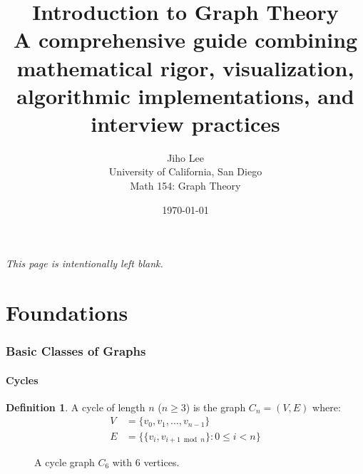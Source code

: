 \documentclass{article}
\title{\Huge\bfseries Introduction to Graph Theory \\[1em]
\Large A comprehensive guide combining mathematical rigor, visualization, algorithmic implementations, and interview practices}
\author{\Large Jiho Lee \\ University of California, San Diego \\[1em] \Large Math 154: Graph Theory}
\date{\Large\today}
\theoremstyle{definition}
\newtheorem{definition}{Definition}
\begin{document}
\begin{titlepage}
    \maketitle
    \thispagestyle{empty}
\end{titlepage}

\newpage
\tableofcontents

\newpage
\thispagestyle{empty}
\vspace*{\fill}
\begin{center}
    \textit{This page is intentionally left blank.}
\end{center}
\vspace*{\fill}
\newpage
\part{Foundations}


\section{Basic Classes of Graphs}\label{sec:basic-classes}

\subsection{Cycles}
\begin{definition}
A cycle of length $n$ ($n \geq 3$) is the graph $C_n = (V, E)$ where:
\begin{align*}
V &= \{v_0, v_1, \ldots, v_{n-1}\}\\
E &= \{\{v_i, v_{i+1 \bmod n}\} : 0 \leq i < n\}
\end{align*}
\end{definition}

\begin{figure}[H]
\centering
{}
\caption{A cycle graph $C_6$ with 6 vertices.}
\end{figure}
\end{document}
